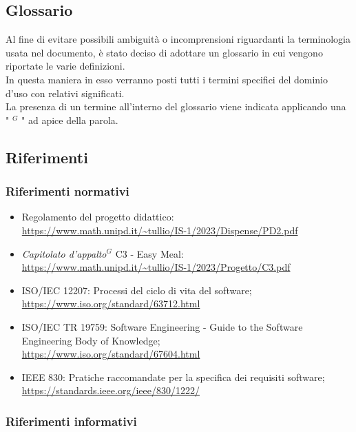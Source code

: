 \subsection{Glossario}
Al fine di evitare possibili ambiguità o incomprensioni riguardanti la terminologia usata nel documento, è stato deciso di adottare un glossario in cui vengono riportate le varie definizioni. \\
In questa maniera in esso verranno posti tutti i termini specifici del dominio d’uso con relativi significati. \\
La presenza di un termine all’interno del glossario viene indicata applicando una " $^{G}$ " ad apice della parola.

\pagebreak
\subsection{Riferimenti}
\subsubsection{Riferimenti normativi}

        \begin{itemize}
            \item Regolamento del progetto didattico: \\
            \url{https://www.math.unipd.it/~tullio/IS-1/2023/Dispense/PD2.pdf}
            \item \emph{Capitolato d’appalto}$^{G}$ C3 - Easy Meal: \\
            \url{https://www.math.unipd.it/~tullio/IS-1/2023/Progetto/C3.pdf} \\
            \item ISO/IEC 12207: Processi del ciclo di vita del software;\\
            \url{https://www.iso.org/standard/63712.html}
            \item ISO/IEC TR 19759: Software Engineering - Guide to the Software Engineering Body of Knowledge; \\
            \url{https://www.iso.org/standard/67604.html}
            \item IEEE 830: Pratiche raccomandate per la specifica dei requisiti software;\\
            \url{https://standards.ieee.org/ieee/830/1222/}
        \end{itemize}

        \subsubsection{Riferimenti informativi}

